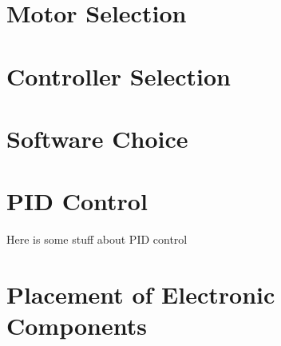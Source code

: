 \section{Motor Selection}
\label{sec:motor_selection}


\section{Controller Selection}
\label{sec:controller_selection}


\section{Software Choice}
\label{sec:software_choice}


\section{PID Control}
\label{sec:pid_control}

Here is some stuff about PID control

\begin{figure}
  
\end{figure}


\section{Placement of Electronic Components}
\label{sec:placement_of_electronic_components}

